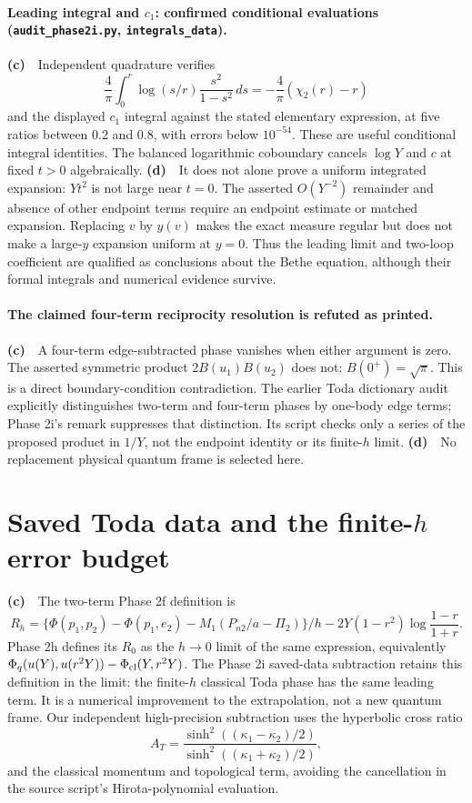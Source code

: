 \documentclass[11pt,a4paper]{article}
\newcommand{\Lc}{\textbf{(c)}\ }
\newcommand{\Ld}{\textbf{(d)}\ }
\newcommand{\scr}{\texttt{audit\_\allowbreak phase2i.py}}
\begin{document}
\paragraph{Leading integral and $c_1$: confirmed conditional evaluations (\scr, \texttt{integrals\_data}).}
\Lc\ Independent quadrature verifies
\[
 \frac4\pi\int_0^r\log(s/r)\frac{s^2}{1-s^2}\,ds
 =-\frac4\pi(\chi_2(r)-r)
\]
and the displayed $c_1$ integral against the stated elementary expression,
at five ratios between $0.2$ and $0.8$, with errors below $10^{-54}$.
These are useful conditional integral identities. The balanced logarithmic
coboundary cancels $\log Y$ and $c$ at fixed $t>0$ algebraically.
\Ld\ It does not alone prove a uniform integrated expansion: $Yt^2$ is not
large near $t=0$. The asserted $O(Y^{-2})$ remainder and absence of other
endpoint terms require an endpoint estimate or matched expansion. Replacing
$v$ by $y(v)$ makes the exact measure regular but does not make a large-$y$
expansion uniform at $y=0$. Thus the leading limit and two-loop coefficient
are qualified as conclusions about the Bethe equation, although their formal
integrals and numerical evidence survive.

\paragraph{The claimed four-term reciprocity resolution is refuted as printed.}
\Lc\ A four-term edge-subtracted phase vanishes when either argument is zero.
The asserted symmetric product $2B(u_1)B(u_2)$ does not: $B(0^+)=\sqrt\pi$.
This is a direct boundary-condition contradiction. The earlier Toda dictionary
audit explicitly distinguishes two-term and four-term phases by one-body edge
terms; Phase 2i's remark suppresses that distinction. Its script checks only a
series of the proposed product in $1/Y$, not the endpoint identity or its
finite-$h$ limit. \Ld\ No replacement physical quantum frame is selected here.

\section{Saved Toda data and the finite-$h$ error budget}
\Lc\ The two-term Phase 2f definition is
\[
 R_h=\{\Phi(p_1,p_2)-\Phi(p_1,e_2)-M_1(P_{n2}/a-\Pi_2)\}/h
       -2Y(1-r^2)\log\frac{1-r}{1+r}.
\]
Phase 2h defines its $R_0$ as the $h\to0$ limit of the same expression,
equivalently $\Phi_q(u(Y),u(r^2Y))-\Phi_{\rm cl}(Y,r^2Y)$.
The Phase 2i saved-data subtraction retains this definition in the limit:
the finite-$h$ classical Toda phase has the same leading term.
It is a numerical improvement to the extrapolation, not a new quantum frame.
Our independent high-precision subtraction uses the hyperbolic cross ratio
\[
 A_T=\frac{\sinh^2((\kappa_1-\kappa_2)/2)}
           {\sinh^2((\kappa_1+\kappa_2)/2)},
\]
and the classical momentum and topological term, avoiding the cancellation
in the source script's Hirota-polynomial evaluation.
\end{document}

